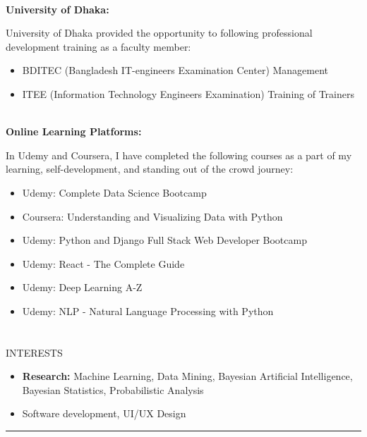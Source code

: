 \documentclass{my_cv}
\begin{document}
\noindent\\
{\bf University of Dhaka:} 

University of Dhaka provided the opportunity to following professional development training as a faculty member:

\begin{itemize}[noitemsep]
    \item BDITEC (Bangladesh IT-engineers Examination Center) Management
    \item ITEE (Information Technology Engineers Examination) Training of Trainers
\end{itemize}

\noindent\\
{\bf Online Learning Platforms:} 

In Udemy and Coursera, I have completed the following courses as a part of my learning, self-development, and standing out of the crowd journey:

\begin{itemize}[noitemsep]
    \item Udemy: Complete Data Science Bootcamp
    \item Coursera: Understanding and Visualizing Data with Python
    \item Udemy: Python and Django Full Stack Web Developer Bootcamp
    \item Udemy: React - The Complete Guide
    \item Udemy: Deep Learning A-Z
    \item Udemy: NLP - Natural Language Processing with Python
\end{itemize}

\section{\faSoccerBallO}{INTERESTS}

\begin{itemize}[noitemsep]
    \item \textbf{Research:} Machine Learning, Data Mining, Bayesian Artificial Intelligence, Bayesian Statistics, Probabilistic Analysis 
    \item Software development, UI/UX Design
\end{itemize}


\noindent\rule{18.75cm}{0.6pt}
\vspace{20pt}
\end{document}
